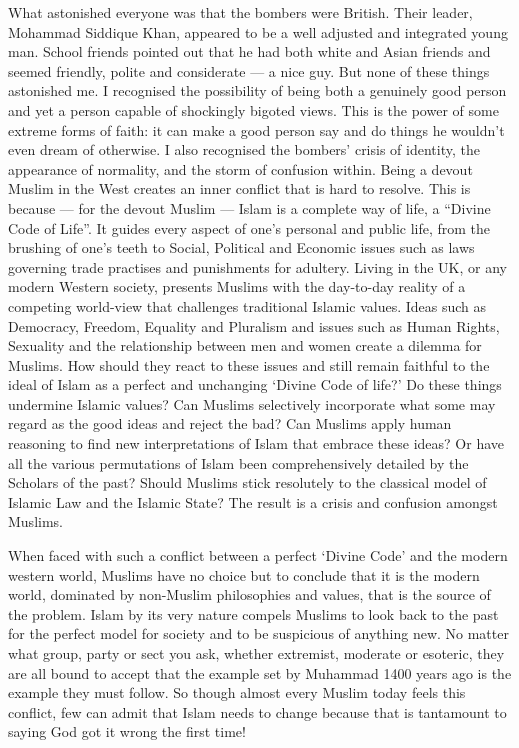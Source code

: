 \documentclass[12pt]{memoir}
\begin{document}
What astonished everyone was that the bombers were British.
Their leader, Mohammad Siddique Khan,
appeared to be a well adjusted and integrated young man.
School friends pointed out that he had both white and Asian friends
and seemed friendly, polite and considerate — a nice guy.
But none of these things astonished me.
I recognised the possibility of being both a genuinely good person
and yet a person capable of shockingly bigoted views.
This is the power of some extreme forms of faith:
it can make a good person say and do things
he wouldn’t even dream of otherwise.
I also recognised the bombers’ crisis of identity,
the appearance of normality, and the storm of confusion within.
Being a devout Muslim in the West creates an inner conflict
that is hard to resolve.
This is because — for the devout Muslim —
Islam is a complete way of life, a “Divine Code of Life”.
It guides every aspect of one’s personal and public life,
from the brushing of one’s teeth to Social, Political and Economic issues
such as laws governing trade practises and punishments for adultery.
Living in the UK, or any modern Western society, presents Muslims with
the day-to-day reality of a competing world-view
that challenges traditional Islamic values.
Ideas such as Democracy, Freedom, Equality and Pluralism
and issues such as Human Rights, Sexuality and the relationship
between men and women create a dilemma for Muslims.
How should they react to these issues and still remain faithful
to the ideal of Islam as a perfect and unchanging ‘Divine Code of life?’
Do these things undermine Islamic values?
Can Muslims selectively incorporate what some may regard
as the good ideas and reject the bad?
Can Muslims apply human reasoning to find new interpretations of Islam
that embrace these ideas?
Or have all the various permutations of Islam
been comprehensively detailed by the Scholars of the past?
Should Muslims stick resolutely to the classical model
of Islamic Law and the Islamic State?
The result is a crisis and confusion amongst Muslims.

When faced with such a conflict between a perfect ‘Divine Code’
and the modern western world, Muslims have no choice
but to conclude that it is the modern world,
dominated by non-Muslim philosophies and values,
that is the source of the problem.
Islam by its very nature compels Muslims to look back to the past
for the perfect model for society and to be suspicious of anything new.
No matter what group, party or sect you ask, whether extremist,
moderate or esoteric, they are all bound to accept that the example
set by Muhammad 1400 years ago is the example they must follow.
So though almost every Muslim today feels this conflict,
few can admit that Islam needs to change because
that is tantamount to saying God got it wrong the first time!
\end{document}
